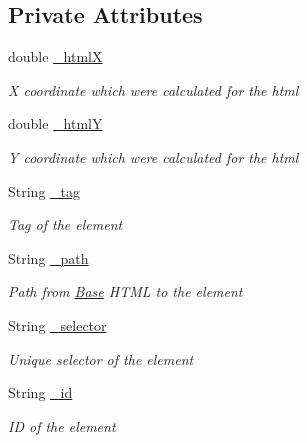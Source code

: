 \subsection*{Private Attributes}
\begin{DoxyCompactItemize}
\item 
double \hyperlink{class_web_analyzer_1_1_models_1_1_data_model_1_1_d_o_m_element_model_a8c54222edebcf6248dc410d83bc2dccb}{\+\_\+html\+X}
\begin{DoxyCompactList}\small\item\em X coordinate which were calculated for the html \end{DoxyCompactList}\item 
double \hyperlink{class_web_analyzer_1_1_models_1_1_data_model_1_1_d_o_m_element_model_ac6d9264bac06b6653533e492138e8160}{\+\_\+html\+Y}
\begin{DoxyCompactList}\small\item\em Y coordinate which were calculated for the html \end{DoxyCompactList}\item 
String \hyperlink{class_web_analyzer_1_1_models_1_1_data_model_1_1_d_o_m_element_model_a189cb52ec2fbbc5d2fad73187ffa9404}{\+\_\+tag}
\begin{DoxyCompactList}\small\item\em Tag of the element \end{DoxyCompactList}\item 
String \hyperlink{class_web_analyzer_1_1_models_1_1_data_model_1_1_d_o_m_element_model_adcfc13a3bc75b3efb29b7328115d2996}{\+\_\+path}
\begin{DoxyCompactList}\small\item\em Path from \hyperlink{namespace_web_analyzer_1_1_models_1_1_base}{Base} H\+T\+M\+L to the element \end{DoxyCompactList}\item 
String \hyperlink{class_web_analyzer_1_1_models_1_1_data_model_1_1_d_o_m_element_model_a1fba31f038cfcd20e7be095aa736695a}{\+\_\+selector}
\begin{DoxyCompactList}\small\item\em Unique selector of the element \end{DoxyCompactList}\item 
String \hyperlink{class_web_analyzer_1_1_models_1_1_data_model_1_1_d_o_m_element_model_a4f824d5be5dd68766e0a50d5f27a8dfc}{\+\_\+id}
\begin{DoxyCompactList}\small\item\em I\+D of the element \end{DoxyCompactList}\item 

\end{DoxyCompactItemize}
